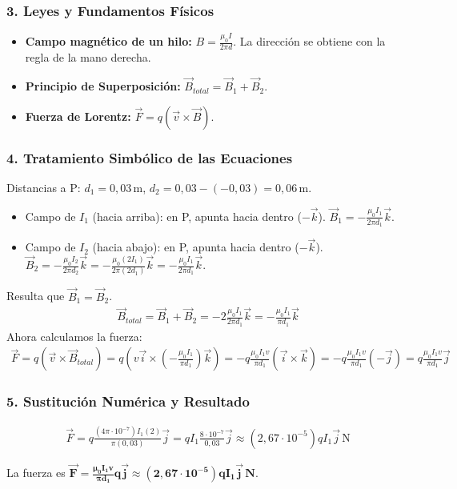 \subsubsection*{3. Leyes y Fundamentos Físicos}
\begin{itemize}
    \item \textbf{Campo magnético de un hilo:} $B=\frac{\mu_0 I}{2\pi d}$. La dirección se obtiene con la regla de la mano derecha.
    \item \textbf{Principio de Superposición:} $\vec{B}_{total} = \vec{B}_1 + \vec{B}_2$.
    \item \textbf{Fuerza de Lorentz:} $\vec{F} = q(\vec{v} \times \vec{B})$.
\end{itemize}
\subsubsection*{4. Tratamiento Simbólico de las Ecuaciones}
Distancias a P: $d_1=0,03\,\text{m}$, $d_2 = 0,03 - (-0,03) = 0,06\,\text{m}$.
\begin{itemize}
    \item Campo de $I_1$ (hacia arriba): en P, apunta hacia dentro ($-\vec{k}$). $\vec{B}_1 = -\frac{\mu_0 I_1}{2\pi d_1}\vec{k}$.
    \item Campo de $I_2$ (hacia abajo): en P, apunta hacia dentro ($-\vec{k}$). $\vec{B}_2 = -\frac{\mu_0 I_2}{2\pi d_2}\vec{k} = -\frac{\mu_0 (2I_1)}{2\pi (2d_1)}\vec{k} = -\frac{\mu_0 I_1}{2\pi d_1}\vec{k}$.
\end{itemize}
Resulta que $\vec{B}_1 = \vec{B}_2$.
\begin{gather}
    \vec{B}_{total} = \vec{B}_1 + \vec{B}_2 = -2\frac{\mu_0 I_1}{2\pi d_1}\vec{k} = -\frac{\mu_0 I_1}{\pi d_1}\vec{k}
\end{gather}
Ahora calculamos la fuerza:
\begin{gather}
    \vec{F} = q(\vec{v} \times \vec{B}_{total}) = q \left( v\vec{i} \times \left(-\frac{\mu_0 I_1}{\pi d_1}\right)\vec{k} \right) = -q \frac{\mu_0 I_1 v}{\pi d_1} (\vec{i}\times\vec{k}) = -q \frac{\mu_0 I_1 v}{\pi d_1} (-\vec{j}) = q \frac{\mu_0 I_1 v}{\pi d_1} \vec{j}
\end{gather}
\subsubsection*{5. Sustitución Numérica y Resultado}
\begin{gather}
    \vec{F} = q \frac{(4\pi\cdot10^{-7}) I_1 (2)}{\pi (0,03)} \vec{j} = q I_1 \frac{8\cdot10^{-7}}{0,03} \vec{j} \approx (2,67\cdot10^{-5}) q I_1 \vec{j} \, \text{N}
\end{gather}
\begin{cajaresultado}
    La fuerza es $\boldsymbol{\vec{F} = \frac{\mu_0 I_1 v}{\pi d_1} q \vec{j} \approx (2,67\cdot10^{-5}) q I_1 \vec{j}}\,\textbf{N}$.
\end{cajaresultado}
